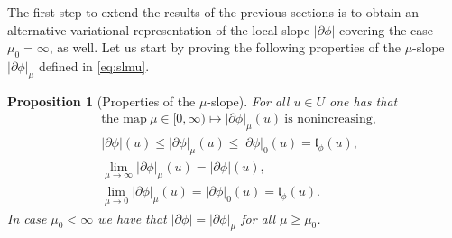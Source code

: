 \documentclass[10pt,a4paper]{amsart}
\renewcommand{\sl}{|\partial \phi|}
\newcommand{\gl}{\mathfrak{l}_\phi}
\newtheorem{proposition}[theorem]{Proposition}
\begin{document}
The first step to extend the results of the previous sections  is to obtain an alternative
variational representation of the local slope $\sl$  covering the
case $\mu_0=\infty$, as well.  
 Let us start by proving the following properties of the
$\mu$-slope $\sl_\mu$ defined in \eqref{eq:slmu}.
\begin{proposition}[Properties of the $\mu$-slope]
  For all  $u\in U$ one has that
  \begin{align}
    &\text{the map} \ \mu\in [0,\infty) \mapsto \sl_\mu(u) \ \text{is nonincreasing},\label{eq:mu0}\\[2mm]
    &\sl(u) \leq \sl_\mu(u)
  \leq  \sl_0(u)=  \gl(u),
      \label{eq:mu1}\\[2mm]
    &\lim_{\mu\to \infty}\sl_\mu(u) = \sl(u), \label{eq:mu2}\\
    &\lim_{\mu\to 0}\sl_\mu(u) =  \sl_0(u)=  \gl(u). \label{eq:mu3}
  \end{align}
In case $\mu_0 <\infty$ we have that $\sl  = \sl_\mu
$ for all $\mu\geq \mu_0$.
\end{proposition}
\end{document}
